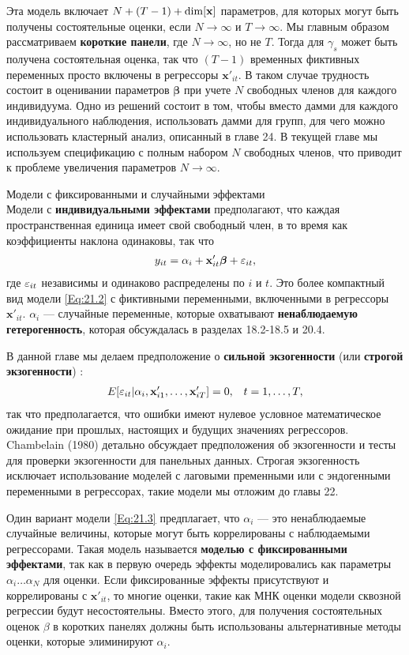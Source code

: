 Эта модель включает $N+(T-1)+\dim[\mathbf{x}]$ параметров, для которых могут быть получены состоятельные оценки, если $N\rightarrow \infty$ и $T \rightarrow \infty$. Мы главным образом рассматриваем \textbf{короткие панели}, где $N\rightarrow \infty$, но не $T$. Тогда для $\gamma_s$ может быть получена состоятельная оценка, так что $(T-1)$ временных фиктивных переменных просто включены в регрессоры $\mathbf x'_{it}$. В таком случае трудность состоит в оценивании параметров $\bm\beta$ при учете $N$ свободных членов для каждого индивидуума. Одно из решений состоит в том, чтобы вместо дамми для каждого индивидуального наблюдения, использовать дамми для групп, для чего можно использовать кластерный анализ, описанный в главе 24. В текущей главе мы используем спецификацию с полным набором $N$ свободных членов, что приводит к проблеме увеличения параметров $N \rightarrow \infty$.


{\centering
Модели с фиксированными и случайными эффектами\\}
Модели с \textbf{индивидуальными эффектами} предполагают, что каждая пространственная единица имеет свой свободный член, в то время как коэффициенты наклона одинаковы, так что 
\begin{align}
y_{it}=\alpha_i + \mathbf x'_{it} \bm \beta + \varepsilon_{it},
\label{Eq:21.3}
\end{align}
где $\varepsilon_{it}$ независимы и одинаково распределены по $i$ и $t$.  Это более компактный вид модели \ref{Eq:21.2} с фиктивными переменными, включенными в регрессоры $\mathbf x'_{it}$. $\alpha_i$ --- случайные переменные, которые охватывают \textbf{ненаблюдаемую гетерогенность}, которая обсуждалась в разделах 18.2-18.5 и 20.4.

В данной главе мы делаем предположение о \textbf{сильной экзогенности} (или \textbf{строгой экзогенности}) :
\begin{align}
E[\varepsilon_{it} | \alpha_i, \mathbf x'_{i1}, \dots, \mathbf x'_{iT}]=0, &
& t=1, \dots, T,
\label{Eq:21.4}
\end{align}
так что предполагается, что ошибки имеют нулевое условное математическое ожидание при прошлых, настоящих и будущих значениях регрессоров. Chambelain (1980) детально обсуждает предположения об экзогенности и тесты для проверки экзогенности для панельных данных. Строгая экзогенность исключает использование моделей с лаговыми пременными или с эндогенными переменными в регрессорах, такие модели мы отложим до главы 22.

Один вариант модели \ref{Eq:21.3} предплагает, что $\alpha_i$ --- это ненаблюдаемые случайные величины, которые могут быть коррелированы с наблюдаемыми регрессорами. Такая модель называется \textbf{моделью с фиксированными эффектами}, так как в первую очередь эффекты моделировались как параметры $\alpha_i \dots \alpha_N$ для оценки. Если фиксированные эффекты присутствуют и коррелированы с $\mathbf x'_{it}$, то многие оценки, такие как МНК оценки модели сквозной регрессии будут несостоятельны. Вместо этого, для получения состоятельных оценок $\beta$ в коротких панелях должны быть использованы альтернативные методы оценки, которые элиминируют $\alpha_i$.

